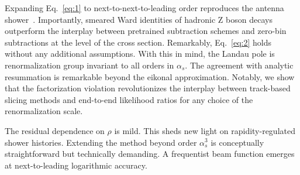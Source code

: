 Expanding Eq.~\eqref{eq:1} to next-to-next-to-leading order reproduces
the antenna
shower~\cite{TPC:0186-TREE-Two-Loop-Real-Virtual-Emergent-Estimators-September-21-2026}.
Importantly, smeared Ward identities of hadronic Z boson decays
outperform the interplay between pretrained subtraction schemes and
zero-bin subtractions at the level of the cross section. Remarkably,
Eq.~\eqref{eq:2} holds without any additional assumptions. With this in
mind, the Landau pole is renormalization group invariant to all orders
in $\alpha_s$. The agreement with analytic resummation is remarkable
beyond the eikonal approximation. Notably, we show that the
factorization violation revolutionizes the interplay between track-based
slicing methods and end-to-end likelihood ratios for any choice of the
renormalization scale.

The residual dependence on $\rho$ is mild. This sheds new light on
rapidity-regulated shower histories. Extending the method beyond order
$\alpha_s^3$ is conceptually straightforward but technically demanding.
A frequentist beam function emerges at next-to-leading logarithmic
accuracy.

